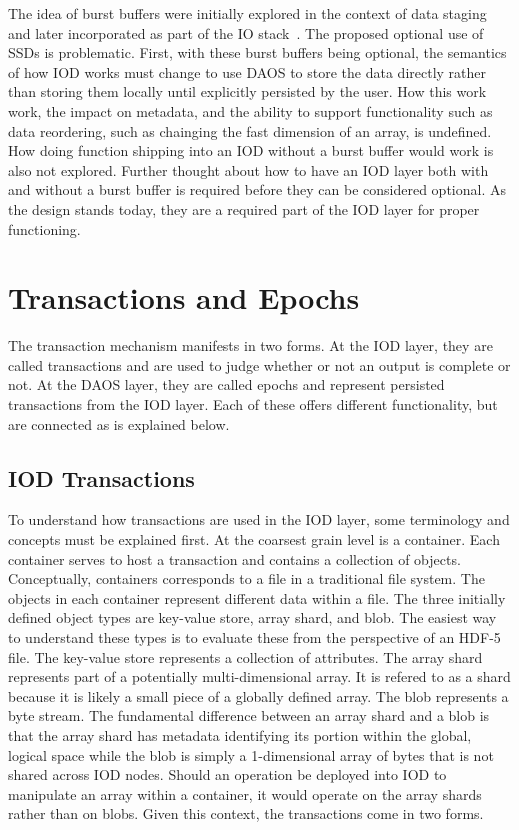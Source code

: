 \documentclass[conference]{sig-alt-gov2}
\begin{document}
The idea of burst buffers were initially explored in the context of data
staging~\cite{abbasi:2007:datatap,Abbasi:2009:datatap,nisar:2008:staging,zheng:2010:predata}
and later incorporated as part of the IO
stack~\cite{bent:2012:challenges,bent:2012:burst-buffer}. The proposed optional
use of SSDs is problematic. First, with these burst buffers being optional, the
semantics of how IOD works must change to use DAOS to store the data directly
rather than storing them locally until explicitly persisted by the user. How
this work work, the impact on metadata, and the ability to support
functionality such as data reordering, such as chainging the fast dimension of
an array, is undefined. How doing function shipping into an IOD without a burst
buffer would work is also not explored. Further thought about how to have an
IOD layer both with and without a burst buffer is required before they can be
considered optional. As the design stands today, they are a required part of
the IOD layer for proper functioning.

\section{Transactions and Epochs}
\label{sec:transactions}

The transaction mechanism manifests in two forms. At the IOD layer, they are
called transactions and are used to judge whether or not an output is complete
or not. At the DAOS layer, they are called epochs and represent persisted
transactions from the IOD layer. Each of these offers different functionality,
but are connected as is explained below.

\subsection{IOD Transactions}
To understand how transactions are used in the IOD layer, some terminology and
concepts must be explained first. At the coarsest grain level is a container.
Each container serves to host a transaction and contains a collection of
objects. Conceptually, containers corresponds to a file in a traditional file
system. The objects in each container represent different data within a file.
The three initially defined object types are key-value store, array shard,
and blob. The easiest way to understand these types is to evaluate these from
the perspective of an HDF-5 file. The key-value store represents a collection
of attributes. The array shard represents part of a potentially
multi-dimensional array. It is refered to as a shard because it is likely a
small piece of a globally defined array. The blob represents a byte stream.
The fundamental difference between an array shard and a blob is that the array
shard has metadata identifying its portion within the global, logical space
while the blob is simply a 1-dimensional array of bytes that is not shared
across IOD nodes. Should an operation be deployed into IOD to manipulate an
array within a container, it would operate on the array shards rather than on
blobs. Given this context, the transactions come in two forms.
\end{document}
